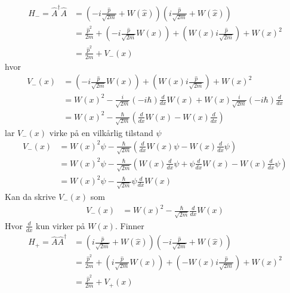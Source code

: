 \documentclass[norsk,a4paper,12pt]{article}
\begin{document}
\begin{equation}
\begin{aligned}
	\hat{H}_- = \hat{A}^\dagger \hat{A} &= (-i\frac{\hat p}{\sqrt{2m}}+W(\hat x)) (i\frac{\hat p}{\sqrt{2m}}+W(\hat x)) \\
	&= \frac{\hat p^2}{2m} + (-i\frac{\hat p}{\sqrt{2m}} W(x)) + (W(x) i\frac{\hat p}{\sqrt{2m}}) + W(x)^2 \\
	&= \frac{\hat p^2}{2m} + V_-(x)
\end{aligned}
\end{equation}
hvor
\begin{equation}
\begin{aligned}
	V_-(x) &= (-i\frac{\hat p}{\sqrt{2m}} W(x)) + (W(x) i\frac{\hat p}{\sqrt{2m}}) + W(x)^2 \\
	&= W(x)^2 - \frac{i}{\sqrt{2m}}(-i\hbar) \frac{d}{d x} W(x) + W(x) \frac{i}{\sqrt{2m}}(-i\hbar) \frac{d}{d x} \\
	&= W(x)^2 - \frac{\hbar}{\sqrt{2m}} (\frac{d}{d x}W(x) - W(x)\frac{d}{d x})
\end{aligned}
\end{equation}
lar $V_-(x)$ virke på en vilkårlig tilstand $\psi$
\begin{equation}
\begin{aligned}
	V_-(x) &= W(x)^2\psi - \frac{\hbar}{\sqrt{2m}} (\frac{d}{d x}W(x)\psi - W(x)\frac{d}{d x}\psi) \\
	&= W(x)^2\psi - \frac{\hbar}{\sqrt{2m}} (W(x)\frac{d}{d x}\psi + \psi\frac{d}{d x}W(x) - W(x)\frac{d}{d x}\psi) \\
	&= W(x)^2\psi - \frac{\hbar}{\sqrt{2m}} \psi\frac{d}{d x}W(x)
\end{aligned}
\end{equation}
Kan da skrive $V_-(x)$ som
\begin{equation}
\begin{aligned}
	V_-(x) &= W(x)^2 - \frac{\hbar}{\sqrt{2m}} \frac{d}{d x}W(x)
\end{aligned}
\end{equation}
Hvor $\frac{d}{d x}$ kun virker på $W(x)$. Finner
\begin{equation}
\begin{aligned}
	\hat{H}_+ = \hat{A} \hat{A}^\dagger &= (i\frac{\hat p}{\sqrt{2m}}+W(\hat x)) (-i\frac{\hat p}{\sqrt{2m}}+W(\hat x)) \\
	&= \frac{\hat p^2}{2m} + (i\frac{\hat p}{\sqrt{2m}} W(x)) + (-W(x) i\frac{\hat p}{\sqrt{2m}}) + W(x)^2 \\
	&= \frac{\hat p^2}{2m} + V_+(x)
\end{aligned}
\end{equation}
\end{document}
